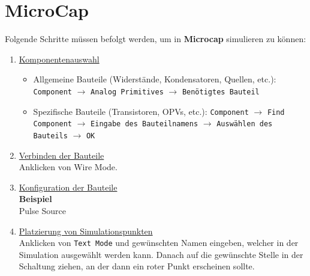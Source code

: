 \section{MicroCap}
Folgende Schritte müssen befolgt werden, um in \textbf{Microcap} simulieren zu können:
\begin{enumerate}

    \item \underline{Komponentenauswahl} \\
    \begin{itemize}
        \item Allgemeine Bauteile (Widerstände, Kondensatoren, Quellen, etc.): \verb|Component| $\rightarrow$ \verb|Analog Primitives| $\rightarrow$ \verb|Benötigtes Bauteil|
        \item Spezifische Bauteile (Transistoren, OPVs, etc.): \verb|Component| $\rightarrow$ \verb|Find Component| $\rightarrow$ \verb|Eingabe des Bauteilnamens| $\rightarrow$ \verb|Auswählen des Bauteils| $\rightarrow$ \verb|OK|
    \end{itemize}
    \item \underline{Verbinden der Bauteile} \\
    Anklicken von Wire Mode. 

    \item \underline{Konfiguration der Bauteile} \\
    \textbf{Beispiel} \\
    Pulse Source

    \item \underline{Platzierung von Simulationspunkten} \\
    Anklicken von \verb|Text Mode| und gewünschten Namen eingeben, welcher in der Simulation ausgewählt werden kann. Danach auf die gewünschte Stelle in der Schaltung ziehen, an der dann ein roter Punkt erscheinen sollte.


\end{enumerate}

